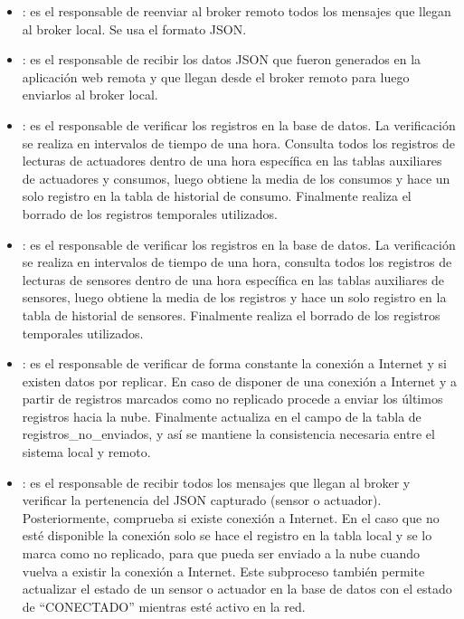 \begin{itemize}
\item {}: es el responsable de reenviar al broker remoto todos los mensajes que llegan al broker local. Se usa el formato JSON.

\item {}: es el responsable de recibir los datos JSON que fueron generados en la aplicación web remota y que llegan desde el broker remoto para luego enviarlos al broker local.

\item {}: es el responsable de verificar los registros en la base de datos. La verificación se realiza en intervalos de tiempo de una hora. Consulta todos los registros de lecturas de actuadores dentro de una hora específica en las tablas auxiliares de actuadores y consumos, luego obtiene la media de los consumos y hace un solo registro en la tabla de historial de consumo. Finalmente realiza el borrado de los registros temporales utilizados.

\item {}: es el responsable de verificar los registros en la base de datos. La verificación se realiza en intervalos de tiempo de una hora, consulta todos los registros de lecturas de sensores dentro de una hora específica en las tablas auxiliares de sensores, luego obtiene la media de los registros y hace un solo registro en la tabla de historial de sensores. Finalmente realiza el borrado de los registros temporales utilizados.

\item {}: es el responsable de verificar de forma constante la conexión a Internet y si existen datos por replicar. En caso de disponer de una conexión a Internet y a partir de registros marcados como no replicado procede a enviar los últimos registros hacia la nube. Finalmente actualiza en el campo de la tabla de registros\_no\_enviados, y así se mantiene la consistencia necesaria entre el sistema local y remoto.

\item {}: es el responsable de recibir todos los mensajes que llegan al broker y verificar la pertenencia del JSON capturado (sensor o actuador). Posteriormente, comprueba si existe conexión a Internet. En el caso que no esté disponible la conexión solo se hace el registro en la tabla local y se lo marca como no replicado, para que pueda ser enviado a la nube cuando vuelva a existir la conexión a Internet. Este subproceso también permite actualizar el estado de un sensor o actuador en la base de datos con el estado de ``CONECTADO'' mientras esté activo en la red.


\end{itemize}
